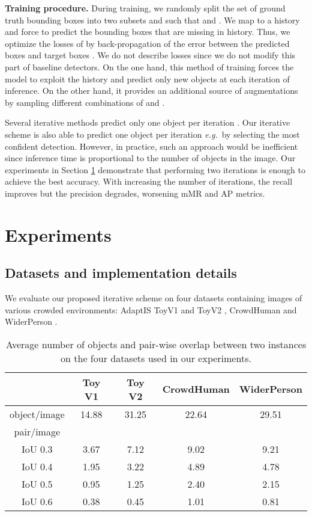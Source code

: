 \documentclass[runningheads]{llncs}
\newcommand{\eg}{\emph{e.g.}\ }
\begin{document}
\textbf{Training procedure.} During training, we randomly split the set of ground truth bounding boxes  into two subsets  and  such that  and . We map  to a history  and force  to predict the bounding boxes  that are missing in history. Thus, we optimize the losses of  by back-propagation of the error between the predicted boxes  and target boxes . We do not describe losses since we do not modify this part of baseline detectors. On the one hand, this method of training forces the model to exploit the history and predict only new objects at each iteration of inference. On the other hand, it provides an additional source of augmentations by sampling different combinations of  and .

Several iterative methods predict only one object per iteration \cite{barinova2012detection,stewart2016end}. Our iterative scheme is also able to predict one object per iteration \eg by selecting the most confident detection. However, in practice, such an approach would be inefficient since inference time is proportional to the number of objects in the image. Our experiments in Section \ref{sec:experiments} demonstrate that performing two iterations is enough to achieve the best accuracy. With increasing the number of iterations, the recall improves but the precision degrades, worsening mMR and AP metrics. 

\section{Experiments}
\label{sec:experiments}

\subsection{Datasets and implementation details}

We evaluate our proposed iterative scheme on four datasets containing images of various crowded environments: AdaptIS ToyV1 and ToyV2 \cite{sofiiuk2019adaptis}, CrowdHuman \cite{shao2018crowdhuman} and WiderPerson \cite{zhang2019widerperson}.

\begin{table*}[t]
    \centering
    \begin{tabular}{c|cccc}
        \hline
        & Toy V1 & Toy V2 & CrowdHuman & WiderPerson \\ \hline \hline
        object/image & 14.88 & 31.25 & 22.64  & 29.51 \\ \hline
        pair/image & & & & \\
        IoU  0.3 & 3.67 & 7.12 & 9.02 & 9.21\\
        IoU  0.4 & 1.95 & 3.22 & 4.89 & 4.78\\
        IoU  0.5 & 0.95 & 1.25 & 2.40 & 2.15\\
        IoU  0.6 & 0.38 & 0.45 & 1.01 & 0.81\\ \hline
    \end{tabular}
    \caption{Average number of objects and pair-wise overlap between two instances on the four datasets used in our experiments.}
    \label{tab:datasets}
\end{table*}
\end{document}
